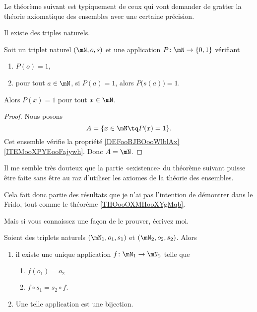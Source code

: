 Le théorème suivant est typiquement de ceux qui vont demander de gratter la théorie axiomatique des ensembles avec une certaine précision.
\begin{theorem}     \label{THOooOXMHooXYgMqb}
    Il existe des triples naturels.
\end{theorem}

\begin{proposition}
    Soit un triplet naturel \( (\mN,o,s)\) et une application \( P\colon \mN\to \{ 0,1 \}\) vérifiant
    \begin{enumerate}
        \item
            \( P(o)=1\),
        \item
            pour tout \( a\in \mN\), si \( P(a)=1\), alors \( P\big( s(a) \big)=1\).
    \end{enumerate}
    Alors \( P(x)=1\) pour tout \( x\in \mN\).
\end{proposition}

\begin{proof}
    Nous posons 
    \begin{equation}
        A=\{ x\in\mN\tq P(x)=1 \}.
    \end{equation}
    Cet ensemble vérifie la propriété \ref{DEFooBJBOooWlblAx}\ref{ITEMooXPYEooFajywh}. Donc \( A=\mN\).
\end{proof}

\begin{probleme}
    Il me semble très douteux que la partie «existence» du théorème suivant puisse être faite sans être au raz d'utiliser les axiomes de la théorie des ensembles.

    Cela fait donc partie des résultats que je n'ai pas l'intention de démontrer dans le Frido, tout comme le théorème \ref{THOooOXMHooXYgMqb}.

    Mais si vous connaissez une façon de le prouver, écrivez moi.
\end{probleme}

\begin{theorem}     \label{THOooFUXMooJuigHK}
    Soient des triplets naturels \( (\mN_1, o_1,s_1)\) et \( (\mN_2,o_2,s_2)\). Alors
    \begin{enumerate}
        \item
            il existe une unique application \( f\colon \mN_1\to \mN_2\) telle que
            \begin{enumerate}
                \item
                    \( f(o_1)=o_2\)
                \item
                    \( f\circ s_1=s_2\circ f\).
            \end{enumerate}
        \item
            Une telle application est une bijection.
    \end{enumerate}
\end{theorem}

